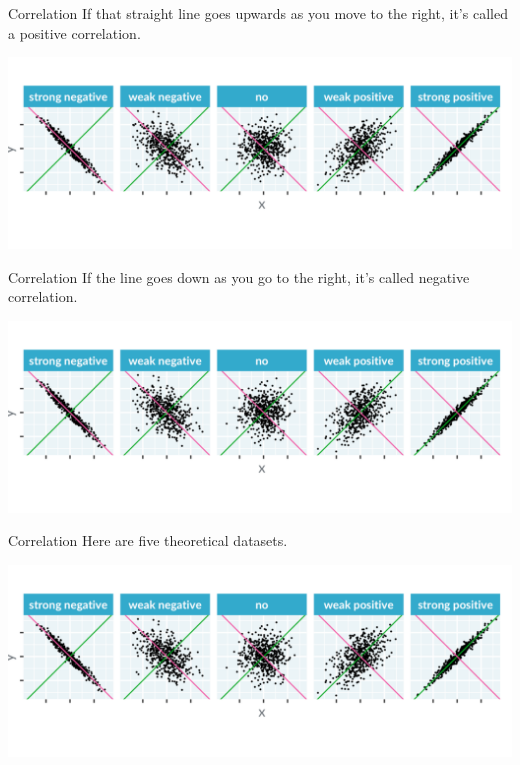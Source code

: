 \documentclass[
  ignorenonframetext,
]{beamer}
\begin{document}
\begin{frame}{Correlation}
\label{correlation-1}
If that straight line goes upwards as you move to the right, it's called
a positive correlation.

\includegraphics{../images/im34.png}
\end{frame}

\begin{frame}{Correlation}
\label{correlation-2}
If the line goes down as you go to the right, it's called negative
correlation.

\includegraphics{../images/im34.png}
\end{frame}

\begin{frame}{Correlation}
\label{correlation-3}
Here are five theoretical datasets.

\includegraphics{../images/im34.png}
\end{frame}
\end{document}
